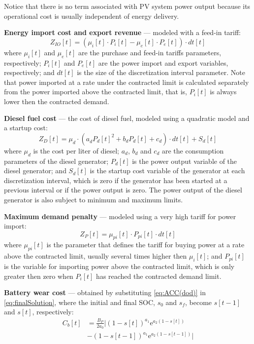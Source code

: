 \documentclass{ieeeaccess}
\begin{document}
    Notice that there is no term associated with \ac{PV} system power output because its operational cost is usually independent of energy delivery.

    \textbf{Energy import cost and export revenue} --- modeled with a feed-in tariff:
    \begin{equation}
        Z_{IO}[t] = \left( \mu_i[t] \cdot P_i[t] - \mu_e[t] \cdot P_e[t] \right) \cdot dt[t]
    \end{equation}
    where $\mu_i[t]$ and $\mu_e[t]$ are the purchase and feed-in tariffs parameters, respectively; $P_{i}[t]$ and $P_{e}[t]$ are the power import and export variables, respectively; and $dt[t]$ is the size of the discretization interval parameter. Note that power imported at a rate under the contracted limit is calculated separately from the power imported above the contracted limit, that is, $P_i[t]$ is always lower then the contracted demand.

    \textbf{Diesel fuel cost} --- the cost of diesel fuel, modeled using a quadratic model and a startup cost:
    \begin{equation}
        Z_D[t] = \mu_d \cdot (a^{}_d P_d[t]^{2} + b_dP_d[t] + c_d) \cdot dt[t] + S_d[t]
    \end{equation}
    where $\mu_d$ is the cost per liter of diesel; $a_d$, $b_d$ and $c_d$ are the consumption parameters of the diesel generator; $P_d[t]$ is the power output variable of the diesel generator; and $S_d[t]$ is the startup cost variable of the generator at each discretization interval, which is zero if the generator has been started at a previous interval or if the power output is zero. The power output of the diesel generator is also subject to minimum and maximum limits.

    \textbf{Maximum demand penalty} --- modeled using a very high tariff for power import:
    \begin{equation}
        Z_P[t] = \mu_{pi}[t] \cdot P_{pi}[t] \cdot dt[t]
    \end{equation}
    where $\mu_{pi}[t]$ is the parameter that defines the tariff for buying power at a rate above the contracted limit, usually several times higher then $\mu_i[t]$; and $P_{pi}[t]$ is the variable for importing power above the contracted limit, which is only greater then zero when $P_i[t]$ has reached the contracted demand limit.

    \textbf{Battery wear cost} --- obtained by substituting \eqref{eq:ACC(dod)} in \eqref{eq:finalSolution}, where the initial and final \ac{SOC}, $s_0$ and $s_f$, become $s[t-1]$ and $s[t]$, respectively:
    \small
    \begin{equation}
        \begin{aligned}
            C_b[t] & = \frac{B_P}{2a_0} \Bigg|(1-s[t])^{a_1}\mathrm{e}^{a_2(1-s[t])} \\
            & - (1-s[t-1])^{a_1}\mathrm{e}^{a_2(1-s[t-1])} \Bigg|
        \end{aligned}
    \end{equation}
	\normalsize
\end{document}
